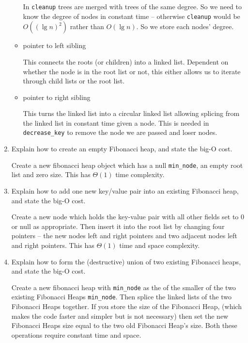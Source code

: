 \documentclass[10pt,\jkfside,a4paper]{article}
\begin{document}
\begin{enumerate}
\begin{itemize}
In {\tt cleanup} trees are merged with trees of the same degree. So we need to know 
the degree of nodes in constant time -- otherwise {\tt cleanup} would be $O((\lg n)^2)$ 
rather than $O(\lg n)$. So we store each nodes' degree.

\item pointer to left sibling

This connects the roots (or children) into a linked list. 
Dependent on whether the node is in the root list or not, this either allows us to iterate 
through child lists or the root list.

\item pointer to right sibling

This turns the linked list into a circular linked list allowing splicing from the linked list 
in constant time given a node. This is needed in {\tt decrease\_key} to remove the node we 
are passed and loser nodes.

\end{itemize}

\item Explain how to create an empty Fibonacci heap, and state the big-O cost.

Create a new fibonacci heap object which has a null {\tt min\_node}, an empty 
root list and zero size. This has $\Theta(1)$ time complexity.

\item Explain how to add one new key/value pair into an existing Fibonacci heap, and state the big-O
cost.

Create a new node which holds the key-value pair with all other fields 
set to 0 or null as appropriate. Then insert it into the root list by changing four pointers -- 
the new nodes left and right pointers and two adjacent nodes left and right pointers. 
This has $\Theta(1)$ time and space complexity.

\item Explain how to form the (destructive) union of two existing Fibonacci heaps, and state the
big-O cost.

Create a new fibonacci heap with {\tt min\_node} as the of the smaller of the two existing 
Fibonacci Heaps {\tt min\_node}. Then splice the linked lists of the two Fibonacci Heaps together. 
If you store the size of the Fibonacci Heap, (which makes the code faster and simpler but is not 
necessary) then set the new Fibonacci Heaps size equal to the two old Fibonacci Heap's size. 
Both these operations require constant time and space.


\end{enumerate}
\end{document}
